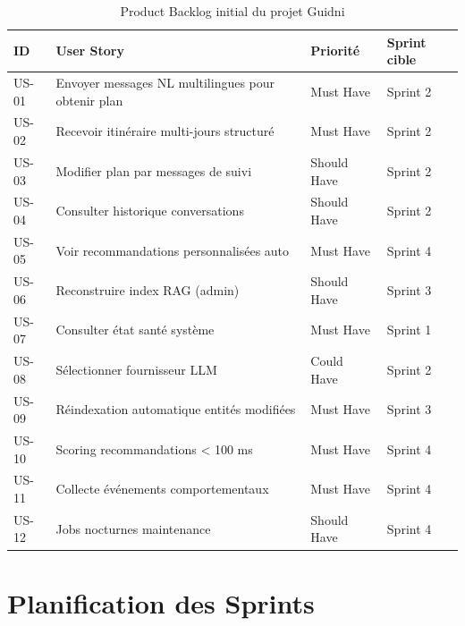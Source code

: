 \begin{table}[H]
    \centering
    \caption{Product Backlog initial du projet Guidni}
    \label{tab:product_backlog}
    \small
    \begin{tabular}{p{1cm} p{7cm} p{2cm} p{3cm}}
        \toprule
        \textbf{ID} & \textbf{User Story} & \textbf{Priorité} & \textbf{Sprint cible} \\
        \midrule
        US-01 & Envoyer messages NL multilingues pour obtenir plan & Must Have & Sprint 2 \\
        US-02 & Recevoir itinéraire multi-jours structuré & Must Have & Sprint 2 \\
        US-03 & Modifier plan par messages de suivi & Should Have & Sprint 2 \\
        US-04 & Consulter historique conversations & Should Have & Sprint 2 \\
        US-05 & Voir recommandations personnalisées auto & Must Have & Sprint 4 \\
        US-06 & Reconstruire index RAG (admin) & Should Have & Sprint 3 \\
        US-07 & Consulter état santé système & Must Have & Sprint 1 \\
        US-08 & Sélectionner fournisseur LLM & Could Have & Sprint 2 \\
        US-09 & Réindexation automatique entités modifiées & Must Have & Sprint 3 \\
        US-10 & Scoring recommandations < 100 ms & Must Have & Sprint 4 \\
        US-11 & Collecte événements comportementaux & Must Have & Sprint 4 \\
        US-12 & Jobs nocturnes maintenance & Should Have & Sprint 4 \\
        \bottomrule
    \end{tabular}
\end{table}


\section{Planification des Sprints}

